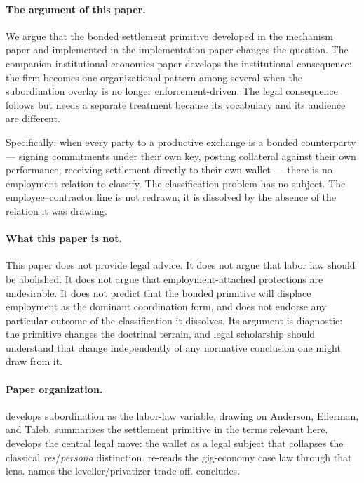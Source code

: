 \documentclass[11pt,a4paper]{article}
\theoremstyle{remark}
\begin{document}
\paragraph{The argument of this paper.}
We argue that the bonded settlement primitive developed
in the mechanism paper and implemented
in the implementation paper changes the question. The companion
institutional-economics paper develops the
institutional consequence: the firm becomes one organizational
pattern among several when the subordination overlay is no longer
enforcement-driven. The legal consequence follows but needs a
separate treatment because its vocabulary and its audience are
different.

Specifically: when every party to a productive exchange is a bonded
counterparty --- signing commitments under their own key, posting
collateral against their own performance, receiving settlement
directly to their own wallet --- there is no employment relation
to classify. The classification problem has no subject. The
employee--contractor line is not redrawn; it is dissolved by the
absence of the relation it was drawing.

\paragraph{What this paper is not.}
This paper does not provide legal advice. It does not argue that
labor law should be abolished. It does not argue that
employment-attached protections are undesirable. It does not
predict that the bonded primitive will displace employment as the
dominant coordination form, and does not endorse any particular
outcome of the classification it dissolves. Its argument is
diagnostic: the primitive changes the doctrinal terrain, and
legal scholarship should understand that change independently of
any normative conclusion one might draw from it.

\paragraph{Paper organization.}
 develops subordination as the
labor-law variable, drawing on Anderson, Ellerman, and Taleb.
 summarizes the settlement primitive in the
terms relevant here.  develops the central legal
move: the wallet as a legal subject that collapses the classical
\emph{res}/\emph{persona} distinction.  re-reads the
gig-economy case law through that lens.
 names the leveller/privatizer trade-off.
 concludes.
\end{document}
